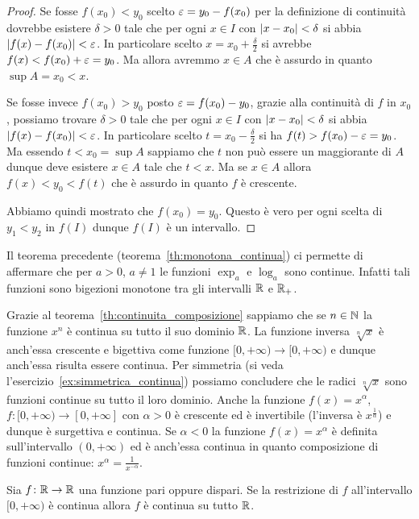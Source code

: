 \begin{proof}
  Se fosse $f(x_0)<y_0$ scelto $\varepsilon = y_0-f(x_0)$
  per la definizione di continuità dovrebbe esistere
  $\delta>0$ tale che per ogni $x\in I$ con ${\left|x-x_0\right|}<\delta$
  si abbia ${\left|f(x)-f(x_0)\right|}<\varepsilon$.
  In particolare scelto $x=x_0+\frac \delta 2$
  si avrebbe $f(x) < f(x_0) + \varepsilon = y_0$.
  Ma allora avremmo $x\in A$ che è assurdo in quanto
  $\sup A = x_0 < x$.
  
  Se fosse invece $f(x_0)>y_0$ posto $\varepsilon = f(x_0)-y_0$,
  grazie alla continuità di $f$ in $x_0$,
  possiamo trovare $\delta>0$ tale che per ogni $x\in I$
  con ${\left|x-x_0\right|}<\delta$ si abbia ${\left|f(x)-f(x_0)\right|}<\varepsilon$.
  In particolare scelto $t = x_0 - \frac \delta 2$
  si ha $f(t) > f(x_0)-\varepsilon = y_0$. 
  Ma essendo $t<x_0 = \sup A$ sappiamo che $t$ non può essere 
  un maggiorante di $A$ dunque deve esistere $x\in A$
  tale che $t<x$. 
  Ma se $x\in A$ allora $f(x) < y_0 < f(t)$
  che è assurdo in quanto $f$ è crescente.
  
  Abbiamo quindi mostrato che $f(x_0)=y_0$. 
  Questo è vero per ogni scelta di $y_1<y_2$ in $f(I)$
  dunque $f(I)$ è un intervallo.
  \end{proof}
  
  Il teorema precedente (teorema~\ref{th:monotona_continua}) ci permette di affermare che per $a>0$, $a\neq 1$ 
  le funzioni 
  $\exp_a$ e $\log_a$ sono continue. 
  Infatti tali funzioni sono bigezioni monotone tra 
  gli intervalli ${\mathbb R}$ e ${\mathbb R}_+$.
  
  Grazie al teorema~\ref{th:continuita_composizione} sappiamo 
  che se $n\in {\mathbb N}$ la funzione $x^n$ è continua su tutto il suo 
  dominio ${\mathbb R}$. 
  La funzione inversa $\sqrt[n]{x}$ è anch'essa crescente e 
  bigettiva come funzione $[0,+\infty)\to[0,+\infty)$ e dunque 
  anch'essa risulta essere continua.
  Per simmetria (si veda l'esercizio~\ref{ex:simmetrica_continua}) 
  possiamo concludere 
  che le radici $\sqrt[n]{x}$ sono 
  funzioni continue su tutto il loro dominio.
  Anche la funzione $f(x) = x^\alpha$, $f\colon [0,+\infty)\to [0,+\infty]$ 
  con $\alpha>0$ è crescente ed è invertibile (l'inversa è $x^{\frac 1 \alpha}$)
  e dunque è surgettiva e continua.
  Se $\alpha<0$ la funzione $f(x)=x^\alpha$ è definita sull'intervallo 
  $(0,+\infty)$ ed è anch'essa continua in quanto 
  composizione di funzioni continue: $x^{\alpha} = \frac{1}{x^{-\alpha}}$.
  
  \begin{exercise}\label{ex:simmetrica_continua}
    Sia $f\colon {\mathbb R}\to {\mathbb R}$ una funzione pari oppure dispari.
    Se la restrizione di $f$ all'intervallo $[0,+\infty)$ 
    è continua allora $f$ è continua su tutto ${\mathbb R}$.
  \end{exercise}
  

